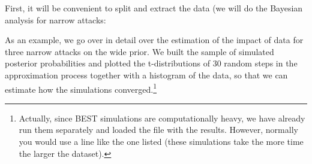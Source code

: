 \documentclass[10pt,]{scrartcl}
\newenvironment{Shaded}{\begin{snugshade}}{\end{snugshade}}
\newcommand{\DecValTok}[1]{\textcolor[rgb]{0.00,0.00,0.81}{#1}}
\newcommand{\StringTok}[1]{\textcolor[rgb]{0.31,0.60,0.02}{#1}}
\newcommand{\OperatorTok}[1]{\textcolor[rgb]{0.81,0.36,0.00}{\textbf{#1}}}
\newcommand{\NormalTok}[1]{#1}
\begin{document}
First, it will be convenient to split and extract the data (we will do
the Bayesian analysis for narrow attacks:

\footnotesize

\begin{Shaded}
\end{Shaded}

\normalsize

As an example, we go over in detail over the estimation of the impact of
data for three narrow attacks on the wide prior. We built the sample of
simulated posterior probabilities and plotted the t-distributions of 30
random steps in the approximation process together with a histogram of
the data, so that we can estimate how the simulations
converged.\footnote{Actually, since BEST simulations are computationally heavy, we have already run them separately and loaded the file with the results. However, normally you would use a line like the one listed (these simulations take the more time the larger the dataset).}
\end{document}
